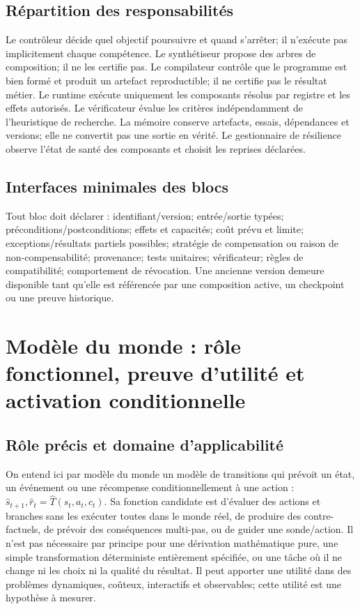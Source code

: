 \documentclass[11pt,a4paper]{article}
\theoremstyle{definition}
\theoremstyle{plain}
\theoremstyle{remark}
\begin{document}
\subsection{Répartition des responsabilités}
Le contrôleur décide quel objectif poursuivre et quand s'arrêter; il n'exécute pas implicitement chaque compétence. Le synthétiseur propose des arbres de composition; il ne les certifie pas. Le compilateur contrôle que le programme est bien formé et produit un artefact reproductible; il ne certifie pas le résultat métier. Le runtime exécute uniquement les composants résolus par registre et les effets autorisés. Le vérificateur évalue les critères indépendamment de l'heuristique de recherche. La mémoire conserve artefacts, essais, dépendances et versions; elle ne convertit pas une sortie en vérité. Le gestionnaire de résilience observe l'état de santé des composants et choisit les reprises déclarées.

\subsection{Interfaces minimales des blocs}
Tout bloc doit déclarer : identifiant/version; entrée/sortie typées; préconditions/postconditions; effets et capacités; coût prévu et limite; exceptions/résultats partiels possibles; stratégie de compensation ou raison de non-compensabilité; provenance; tests unitaires; vérificateur; règles de compatibilité; comportement de révocation. Une ancienne version demeure disponible tant qu'elle est référencée par une composition active, un checkpoint ou une preuve historique.

\section{Modèle du monde : rôle fonctionnel, preuve d'utilité et activation conditionnelle}
\subsection{Rôle précis et domaine d'applicabilité}
On entend ici par modèle du monde un modèle de transitions qui prévoit un état, un événement ou une récompense conditionnellement à une action : \(\hat{s}_{t+1},\hat{r}_t=\hat{T}(s_t,a_t,c_t)\). Sa fonction candidate est d'évaluer des actions et branches sans les exécuter toutes dans le monde réel, de produire des contre-factuels, de prévoir des conséquences multi-pas, ou de guider une sonde/action. Il n'est pas nécessaire par principe pour une dérivation mathématique pure, une simple transformation déterministe entièrement spécifiée, ou une tâche où il ne change ni les choix ni la qualité du résultat. Il peut apporter une utilité dans des problèmes dynamiques, coûteux, interactifs et observables; cette utilité est une hypothèse à mesurer.
\end{document}
